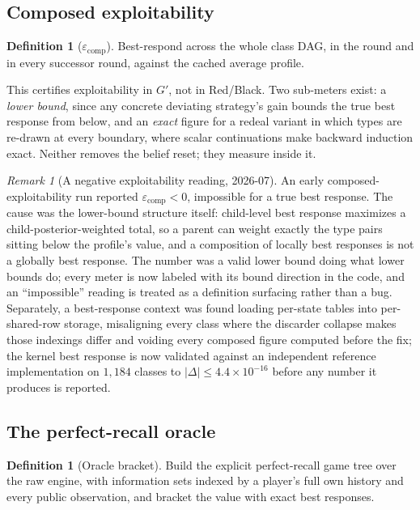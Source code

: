 \documentclass[11pt]{article}
\theoremstyle{plain}
\theoremstyle{definition}
\newtheorem{definition}[theorem]{Definition}
\theoremstyle{remark}
\newtheorem{remark}[theorem]{Remark}
\newcommand{\gp}{\ensuremath{G'}}
\begin{document}
\subsection{Composed exploitability}

\begin{definition}[$\varepsilon_{\text{comp}}$]
Best-respond across the whole class DAG, in the round and in every
successor round, against the cached average profile.
\end{definition}

This certifies exploitability in $\gp$, not in Red/Black. Two sub-meters exist:
a \emph{lower bound}, since any concrete deviating strategy's gain bounds the
true best response from below, and an \emph{exact} figure for a redeal variant
in which types are re-drawn at every boundary, where scalar continuations make
backward induction exact. Neither removes the belief reset; they measure inside
it.

\begin{remark}[A negative exploitability reading, 2026-07]
\label{rem:negeps}
An early composed-exploitability run reported
$\varepsilon_{\text{comp}}<0$, impossible for a true best response. The
cause was the lower-bound structure itself: child-level best response
maximizes a child-posterior-weighted total, so a parent can weight
exactly the type pairs sitting below the profile's value, and a
composition of locally best responses is not a globally best response.
The number was a valid lower bound doing what lower bounds do; every
meter is now labeled with its bound direction in the code, and an
``impossible'' reading is treated as a definition surfacing rather than
a bug. Separately, a best-response context was found loading per-state
tables into per-shared-row storage, misaligning every class where the
discarder collapse makes those indexings differ and voiding every
composed figure computed before the fix; the kernel best response is
now validated against an independent reference implementation on
$1{,}184$ classes to $|\Delta|\le4.4\times10^{-16}$ before any number
it produces is reported.
\end{remark}

\subsection{The perfect-recall oracle}

\begin{definition}[Oracle bracket]
Build the explicit perfect-recall game tree over the raw engine, with
information sets indexed by a player's full own history and every
public observation, and bracket the value with exact best responses.
\end{definition}
\end{document}
